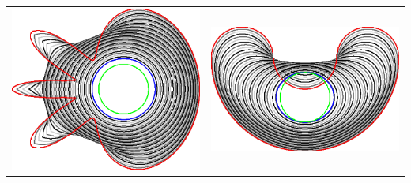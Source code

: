 \begin{frame}
\begin{center}
\begin{tabular}{cc}
\includegraphics[scale=0.12]{figures/graphcut/no-neighborhood-flow-always-improve/0.015625/flower.png}\hspace{3em} &
\includegraphics[scale=0.12]{figures/graphcut/no-neighborhood-flow-always-improve/0.015625/bean.png}
\end{tabular}

\end{center}




\end{frame}

